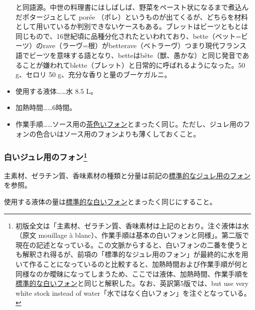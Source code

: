 \begin{recette}
\begin{itemize}
{    と同語源。中世の料理書にはしばしば、野菜をペースト状になるまで煮込んだポタージュとして
    porée
    （ポレ）というものが出てくるが、どちらを材料として用いているか判別できないケースもある。ブレットはビーツともとは同じもので、16世紀頃に品種分化されたといわれており、bette（ベット=ビーツ）のrave（ラーヴ=根）がbetterave（ベトラーヴ）つまり現代フランス語でビーツを意味する語となり、betteはbête（獣、愚かな）と同じ発音であることが嫌われてblette（ブレット）と日常的に呼ばれるようになった。}50
  g、セロリ 50 g、充分な香りと量のブーケガルニ。
\item
  使用する液体\ldots{}\ldots{}水 8.5 L。
\item
  加熱時間\ldots{}\ldots{}6時間。
\item
  作業手順\ldots{}\ldots{}ソース用の\protect\hyperlink{fonds-brun}{茶色いフォン}とまったく同じ。ただし、ジュレ用のフォンの色合いはソース用のフォンよりも薄くしておくこと。
\end{itemize}

\atoaki{}

\hypertarget{fonds-pour-gelee-blanche}{%
\subsubsection[白いジュレ用のフォン]{\texorpdfstring{白いジュレ用のフォン\footnote{初版全文は「主素材、ゼラチン質、香味素材は上記のとおり。注ぐ液体は水（原文
  mouillage à
  blanc）、作業手順は基本の白いフォンと同様」。第二版で現在の記述となっている。この文脈からすると、白いフォンの二番を使うとも解釈され得るが、前項の「標準的なジュレ用のフォン」が最終的に水を用いて作ることになっているのと比較すると、加熱時間および作業手順が何と同様なのか曖昧になってしまうため、ここでは液体、加熱時間、作業手順を\protect\hyperlink{fonds-blanc}{標準的な白いフォン}と同じと解釈した。なお、英訳第5版では、but
  use very white stock instead of
  water「水ではなく白いフォン」を注ぐとなっている。}}{白いジュレ用のフォン}}\label{fonds-pour-gelee-blanche}}



主素材、ゼラチン質、香味素材の種類と分量は前記の\protect\hyperlink{fonds-pour-gelee-ordinaire}{標準的なジュレ用のフォン}を参照。

使用する液体の量は\protect\hyperlink{fonds-blanc}{標準的な白いフォン}とまったく同じにすること。


\end{recette}
